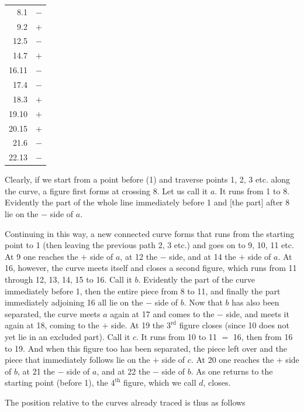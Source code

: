 %
\begin{center}\begin{tabular}{@{}r c@{}}
8.1 & $-$\\
9.2 & $+$\\
12.5 & $-$\\
14.7 & $+$\\
16.11 & $-$\\
17.4 & $-$\\
18.3 & $+$\\
19.10 & $+$\\
20.15 & $+$\\
21.6 & $-$\\
22.13 & $-$\\
\end{tabular}\end{center}

Clearly, if we start from a point before (1) and traverse
points 1, 2, 3 etc. along the curve, a figure first forms at
crossing 8. Let us call it $a$. It runs from 1
to 8. Evidently the part of the whole line immediately before 1 and
[the part] after 8 lie on the $-$ side of $a$.

Continuing in this way, a new connected
curve forms that runs from the starting point to 1 (then leaving the previous path 2, 3 etc.)
and goes on to 9, 10, 11 etc. At 9 one reaches the
$+$ side of $a$, at 12 the $-$ side, and at 14 the $+$ side of $a$.
At 16, however, the curve meets itself and closes a second
figure, which runs from 11 through 12, 13, 14, 15 to 16. Call it $b$.
Evidently the part of the curve immediately before 1, then the entire
piece from 8 to 11, and finally the part immediately adjoining 16 all lie on
the $-$ side of $b$. Now that $b$ has also been separated, the
curve meets $a$ again at 17 and comes to the $-$ side, and meets it again at 18,
coming to the $+$ side. At 19 the $3^{\mathrm{rd}}$
figure closes (since 10 does not yet lie in an excluded part). Call it
$c$. It runs from 10 to 11 $=$ 16, then from 16 to 19. And
when this figure too has been separated, the piece left over
and the piece that immediately follows lie on the $+$ side of $c$. At 20 one reaches
the $+$ side of $b$, at 21 the $-$ side of $a$, and at 22
the $-$ side of $b$. As one returns to the starting point (before 1),
the $4^{\mathrm{th}}$ figure, which we call $d$,
closes.
\par{}
The position relative to the curves already traced is thus as follows
